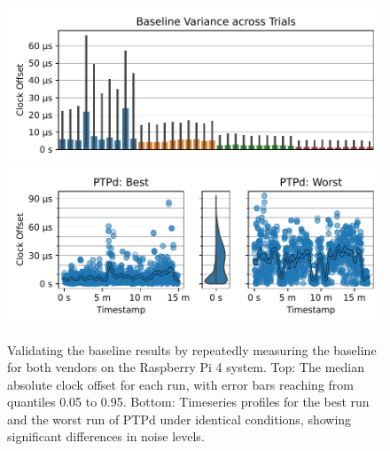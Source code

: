 \begin{figure}
    \centering
    \includegraphics[width=\linewidth]{res/generated/base/key_metric_variance_rpi-4.pdf}
    \includegraphics[width=\linewidth]{res/generated/base/ptpd-good-vs-bad.pdf}

    \legend
    \caption{Validating the baseline results by repeatedly measuring the baseline for both vendors on the Raspberry Pi 4 system. Top: The median absolute clock offset for each run, with error bars reaching from quantiles 0.05 to 0.95. Bottom: Timeseries profiles for the best run and the worst run of PTPd under identical conditions, showing significant differences in noise levels.}
    \label{fig:baseline_reproducibility}
\end{figure}


